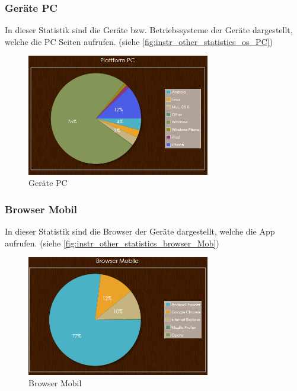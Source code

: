 \subsubsection{Geräte PC}
In dieser Statistik sind die Geräte bzw. Betriebssysteme der Geräte dargestellt, welche die PC Seiten aufrufen. (siehe \autoref{fig:instr_other_statistics_os_PC})
\begin{figure}[H]
\centering
\includegraphics[keepaspectratio=true, width=8cm]{images/screenshots/statistics_os_PC.png}
\caption{Geräte PC}
\label{fig:instr_other_statistics_os_PC}
\end{figure}
\subsubsection{Browser Mobil}
In dieser Statistik sind die Browser der Geräte dargestellt, welche die App aufrufen. (siehe \autoref{fig:instr_other_statistics_browser_Mob})
\begin{figure}[H]
\centering
\includegraphics[keepaspectratio=true, width=8cm]{images/screenshots/statistics_browser_Mob.png}
\caption{Browser Mobil}
\label{fig:instr_other_statistics_browser_Mob}
\end{figure}
